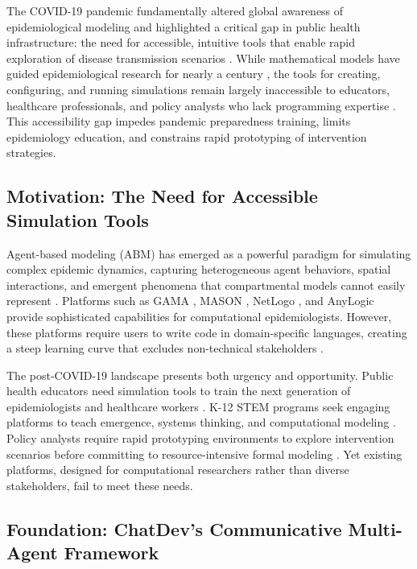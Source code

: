 \label{sec:intro}

The COVID-19 pandemic fundamentally altered global awareness of epidemiological modeling and highlighted a critical gap in public health infrastructure: the need for accessible, intuitive tools that enable rapid exploration of disease transmission scenarios \cite{who2020pandemic}. While mathematical models have guided epidemiological research for nearly a century \cite{kermack1927contribution,anderson1992infectious}, the tools for creating, configuring, and running simulations remain largely inaccessible to educators, healthcare professionals, and policy analysts who lack programming expertise \cite{wilensky2014agent}. This accessibility gap impedes pandemic preparedness training, limits epidemiology education, and constrains rapid prototyping of intervention strategies.

\subsection{Motivation: The Need for Accessible Simulation Tools}

Agent-based modeling (ABM) has emerged as a powerful paradigm for simulating complex epidemic dynamics, capturing heterogeneous agent behaviors, spatial interactions, and emergent phenomena that compartmental models cannot easily represent \cite{bonabeau2002agent,tesfatsion2002agent}. Platforms such as GAMA \cite{grignard2013gama}, MASON \cite{luke2005mason}, NetLogo \cite{wilensky1999netlogo}, and AnyLogic \cite{borshchev2013anylogic} provide sophisticated capabilities for computational epidemiologists. However, these platforms require users to write code in domain-specific languages, creating a steep learning curve that excludes non-technical stakeholders \cite{north2010introducing}.

The post-COVID-19 landscape presents both urgency and opportunity. Public health educators need simulation tools to train the next generation of epidemiologists and healthcare workers \cite{bennett2015simulation,gaba2004future}. K-12 STEM programs seek engaging platforms to teach emergence, systems thinking, and computational modeling \cite{wilensky2015agent,ngss2013next}. Policy analysts require rapid prototyping environments to explore intervention scenarios before committing to resource-intensive formal modeling \cite{saltelli2020five}. Yet existing platforms, designed for computational researchers rather than diverse stakeholders, fail to meet these needs.

\subsection{Foundation: ChatDev's Communicative Multi-Agent Framework}

